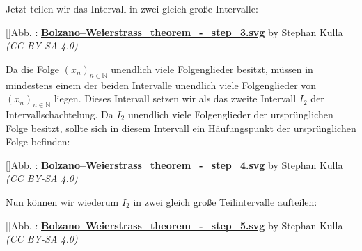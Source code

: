 \documentclass[fontsize=9pt,
               parskip=half-,
               DIV=14,
               listof=chapterentry,
               tocflat]{scrbook}
\newcounter{imagelabel}
\begin{document}
\begin{proof*}
Jetzt teilen wir das Intervall in zwei gleich große Intervalle:

[]{Abb. : \protect\href{https://commons.wikimedia.org/wiki/File:Bolzano–Weierstrass_theorem_-_step_3.svg}{\textbf{Bolzano–Weierstrass\allowbreak\_theorem\allowbreak\_\allowbreak-\allowbreak\_step\allowbreak\_3.svg}} by Stephan Kulla \textit{(CC BY-SA 4.0)}}\begin{center}
\end{center}

Da die Folge $(x_{n})_{n\in \mathbb {N} }$ unendlich viele Folgenglieder besitzt, müssen in mindestens einem der beiden Intervalle unendlich viele Folgenglieder von $(x_{n})_{n\in \mathbb {N} }$ liegen. Dieses Intervall setzen wir als das zweite Intervall $I_{2}$ der Intervallschachtelung. Da $I_{2}$ unendlich viele Folgenglieder der ursprünglichen Folge besitzt, sollte sich in diesem Intervall ein Häufungspunkt der ursprünglichen Folge befinden:

[]{Abb. : \protect\href{https://commons.wikimedia.org/wiki/File:Bolzano–Weierstrass_theorem_-_step_4.svg}{\textbf{Bolzano–Weierstrass\allowbreak\_theorem\allowbreak\_\allowbreak-\allowbreak\_step\allowbreak\_4.svg}} by Stephan Kulla \textit{(CC BY-SA 4.0)}}\begin{center}
\end{center}

Nun können wir wiederum $I_{2}$ in zwei gleich große Teilintervalle aufteilen:

[]{Abb. : \protect\href{https://commons.wikimedia.org/wiki/File:Bolzano–Weierstrass_theorem_-_step_5.svg}{\textbf{Bolzano–Weierstrass\allowbreak\_theorem\allowbreak\_\allowbreak-\allowbreak\_step\allowbreak\_5.svg}} by Stephan Kulla \textit{(CC BY-SA 4.0)}}\begin{center}
\end{center}


\end{proof*}
\end{document}
